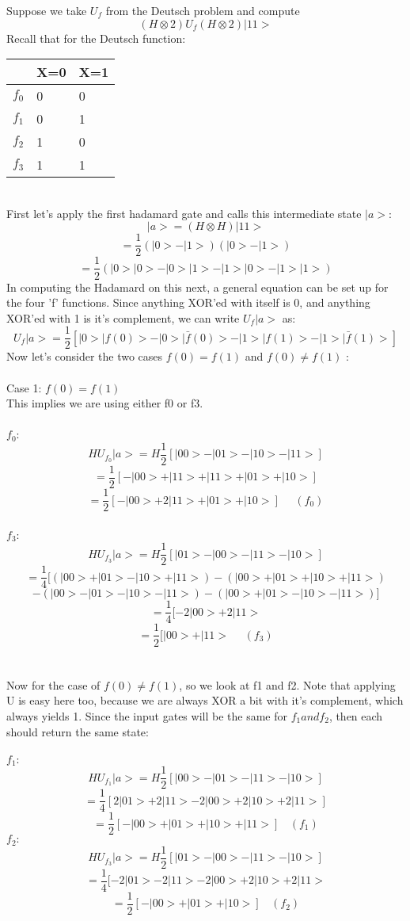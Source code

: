 \documentclass[12pt]{article}
\begin{document}
Suppose we take $U_{f}$ from the Deutsch problem and compute
$$(H\otimes 2)U_{f} (H\otimes 2)|11>$$
Recall that for the Deutsch function:
\\
\begin{table}
    \begin{tabular}{|l|l|l|}
        \hline
        ~  & X=0 & X=1 \\ \hline
        $f_{0}$ & 0   & 0   \\ \hline
        $f_{1}$ & 0   & 1   \\  \hline
        $f_{2}$ & 1   & 0   \\ \hline
        $f_{3}$ & 1   & 1   \\
        \hline
    \end{tabular}
\end{table}
\\
First let's apply the first hadamard gate and calls this intermediate state $|a>$:
$$|a> = (H\otimes H)|11>$$
$$= \frac{1}{2} (|0> - |1>)(|0> - |1>)$$
$$=\frac{1}{2}(|0>|0> - |0>|1> - |1>|0> - |1>|1>)$$
In computing the Hadamard on this next, a general equation can be set up for the four 'f' functions. Since anything XOR'ed with itself is 0, and anything XOR'ed with 1 is it's complement, we can write $U_{f}|a>$ as:
$$U_{f}|a> = \frac{1}{2}[|0>|f(0)> - |0>|\bar{f}(0)> - |1>|f(1)> - |1>|\bar{f}(1)>] $$
Now let's consider the two cases $f(0)=f(1)$ and $f(0) \neq f(1)$ :
\\\\ Case 1: $f(0)=f(1)$
\\This implies we are using either f0 or f3.
\\\\$f_{0}$:
$$ HU_{f_{0}}|a> = H \frac{1}{2}[|00> - |01> - |10> - |11>]$$
$$  = \frac{1}{2}[-|00> + |11> + |11> + |01> + |10>]$$
\[
\boxed{ = \frac{1}{2}[-|00> + 2|11> + |01> + |10>] \>\>\>\>\>\>(f_{0}) }
\] 
\\$f_{3}$:
$$ HU_{f_{3}}|a> = H  \frac{1}{2}[|01> - |00> - |11> - |10>]$$
$$ = \frac{1}{4}[ (|00> + |01> - |10> + |11>) -  (|00> + |01> + |10> + |11>)$$$$- (|00> - |01> - |10> - |11>) - (|00> + |01> - |10> - |11>)]$$
$$ = \frac{1}{4}[-2|00> + 2|11>$$
\[
\boxed{ = \frac{1}{2}[|00> + |11> 	\>\>\>\>\>\>(f_{3})}
\]
\\\\
Now for the case of $f(0) \neq f(1)$, so we look at f1 and f2. Note that applying U is easy here too, because we are always XOR a bit with it's complement, which always yields 1. Since the input gates will be the same for $f_{1} and f_{2}$, then each should return the same state:
\\\\
$f_{1}:$
$$ HU_{f_1}|a> = H \frac{1}{2}[|00> - |01> - |11> - |10>]  $$
$$ = \frac{1}{4}[2|01> + 2|11> - 2|00> + 2|10> + 2|11>] $$
\[
\boxed{ = \frac{1}{2}[-|00> + |01> + |10> + |11>] \>\>\>\> (f_{1}) }
\]
$f_{2}:$
$$ HU_{f_3} |a> = H \frac{1}{2}[|01> - |00> - |11> - |10>]$$
$$ = \frac{1}{4}[-2|01> - 2|11> - 2|00> + 2|10> + 2|11> $$
\[
\boxed{ = \frac{1}{2}[-|00> + |01> + |10>] \>\>\>\>(f_{2})}
\]
\\\\\\\\
\end{document}
